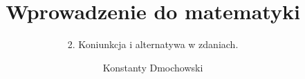 \documentclass[polish,aspectratio=169]{beamer}
\title{Wprowadzenie do matematyki}
\subtitle{2. Koniunkcja i alternatywa w zdaniach.}
\author{Konstanty Dmochowski}
\begin{document}
\begin{frame}
    \titlepage
\end{frame}
\end{document}
